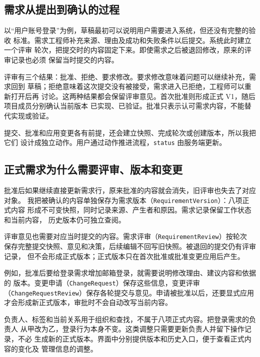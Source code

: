 \documentclass[UTF8,a4paper,12pt]{ctexart}
\newcommand{\code}[1]{\allowbreak\nolinkurl{#1}\allowbreak}
\begin{document}
\subsection{需求从提出到确认的过程}
以“用户账号登录”为例，草稿最初可以说明用户需要进入系统，但还没有完整的验收
标准。需求工程师补充来源、理由及成功和失败条件以后提交。系统此时建立一个评审
轮次，把提交时的内容固定下来。即使需求之后被退回修改，原来的评审记录也必须
保留当时提交的内容。

评审有三个结果：批准、拒绝、要求修改。要求修改意味着问题可以继续补充，需求回到
草稿；拒绝意味着这次提交没有被接受，需求进入已拒绝，工程师可以重新打开后再
讨论。这两种结果都会保留评审意见。首次批准则形成正式 V1，随后项目成员分别确认当前版本
已实现、已验证。批准只表示认可需求内容，不能替代实现或验证。

提交、批准和应用变更各有前提，还会建立快照、完成轮次或创建版本，所以我把它们
设计成独立动作。用户通过动作推进流程，\code{status} 由服务端更新。

\subsection{正式需求为什么需要评审、版本和变更}
批准后如果继续直接更新需求行，原来批准的内容就会消失，旧评审也失去了对应对象。
我把被确认的内容单独保存为需求版本（\code{RequirementVersion}）：八项正式内容
形成不可变快照，同时记录来源、产生者和原因。需求记录保留工作状态和当前内容，
历史版本仍可独立查阅。

评审意见也需要对应当时提交的内容。需求评审（\code{RequirementReview}）按轮次
保存完整提交快照、意见和决策，后续编辑不回写旧快照。被退回的提交仍有评审记录，
但不会形成正式版本；正式版本只在首次批准或批准变更应用后产生。

\begin{samepage}
例如，批准后要给登录需求增加邮箱登录，就需要说明修改理由、建议内容和依据的
版本。变更申请（\code{ChangeRequest}）保存这些信息，变更评审（\code{ChangeRequestReview}）保存各轮提交与意见。申请被批准以后，还要显式应用
才会形成新正式版本，审批时不会自动改写当前内容。\par
\end{samepage}

负责人、标签和当前关系用于组织和查找，不属于八项正式内容。把登录需求的负责人
从甲改为乙，登录行为本身不变。这类调整只需要更新负责人并留下操作记录，不必
生成新的正式版本。界面中分别提供版本和历史入口，便于查看正式内容的变化及
管理信息的调整。
\end{document}
